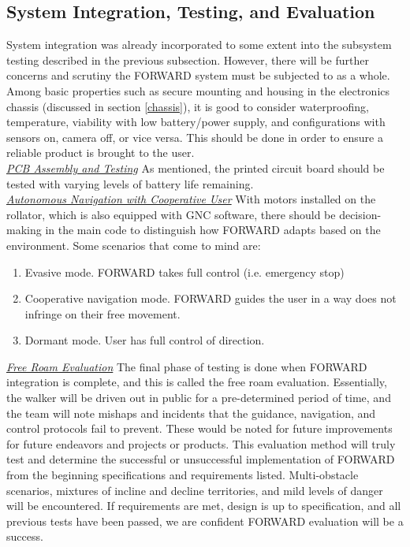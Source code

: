 \subsection{System Integration, Testing, and Evaluation}
\noindent System integration was already incorporated to some extent into the subsystem testing described in the previous subsection. However, there will be further concerns and scrutiny the FORWARD system must be subjected to as a whole. Among basic properties such as secure mounting and housing in the electronics chassis (discussed in section \ref{chassis}), it is good to consider waterproofing, temperature, viability with low battery/power supply, and configurations with sensors on, camera off, or vice versa. This should be done in order to ensure a reliable product is brought to the user.\\

\noindent \underline{\textit{PCB Assembly and Testing}}
\noindent As mentioned, the printed circuit board should be tested with varying levels of battery life remaining. \\

\noindent \underline{\textit{Autonomous Navigation with Cooperative User}}
\noindent With motors installed on the rollator, which is also equipped with GNC software, there should be decision-making in the main code to distinguish how FORWARD adapts based on the environment. Some scenarios that come to mind are:
\begin{enumerate}
	\item Evasive mode. FORWARD takes full control (i.e. emergency stop)
	\item Cooperative navigation mode. FORWARD guides the user in a way does not infringe on their free movement.
	\item Dormant mode. User has full control of direction.
\end{enumerate}

\noindent \underline{\textit{Free Roam Evaluation}}
\noindent The final phase of testing is done when FORWARD integration is complete, and this is called the free roam evaluation. Essentially, the walker will be driven out in public for a pre-determined period of time, and the team will note mishaps and incidents that the guidance, navigation, and control protocols fail to prevent. These would be noted for future improvements for future endeavors and projects or products. This evaluation method will truly test and determine the successful or unsuccessful implementation of FORWARD from the beginning specifications and requirements listed. Multi-obstacle scenarios, mixtures of incline and decline territories, and mild levels of danger will be encountered. If requirements are met, design is up to specification, and all previous tests have been passed, we are confident FORWARD evaluation will be a success.\\
